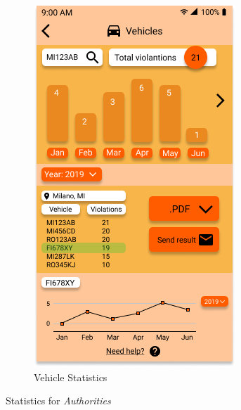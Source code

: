 \documentclass{article}
\begin{document}
\begin{figure}[H]
\begin{subfigure}{0.5\textwidth}
        \includegraphics[width=0.9\linewidth]{img/mockups/statistics_authority_vehicles.png}
        \caption{Vehicle Statistics}
        \label{fig:subim2}
    \end{subfigure}
    \caption{Statistics for \textit{Authorities}}
    \label{fig:image2}
\end{figure}

\clearpage
\end{document}
